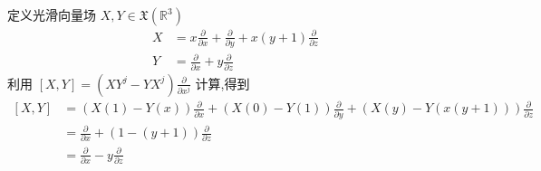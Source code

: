 \documentclass[../../几何与拓扑.tex]{subfiles}
\begin{document}
\begin{example}
    定义光滑向量场 \(  X,Y\in \mathfrak{X}\left( \mathbb{R} ^{3} \right)   \) \[
    \begin{aligned}
    X&=  x \frac{\partial }{\partial x} + \frac{\partial }{\partial y} + x\left( y+ 1 \right) \frac{\partial }{\partial z}\\ 
     Y& =  \frac{\partial }{\partial x} +  y\frac{\partial }{\partial z}  
    \end{aligned}
    \] 
    利用 \(  [X,Y] =  \left( XY^{j}-YX^{j} \right)   \frac{\partial }{\partial x^{j}}\)  计算,得到 \[
    \begin{aligned}
    [X,Y]& =  \left( X\left( 1 \right)- Y\left( x \right)   \right) \frac{\partial }{\partial x} +  \left( X\left( 0 \right)-Y \left( 1 \right)   \right) \frac{\partial }{\partial y}    +  \left( X \left( y \right)-Y\left( x\left( y+ 1 \right)  \right)   \right) \frac{\partial }{\partial z}\\ 
     & =  \frac{\partial }{\partial x}+ \left(1-\left( y+ 1 \right)  \right) \frac{\partial }{\partial z}  \\ 
      &  =  \frac{\partial }{\partial x}-y \frac{\partial }{\partial z}
    \end{aligned}
    \]
\end{example}

\hspace*{\fill} 
\end{document}
